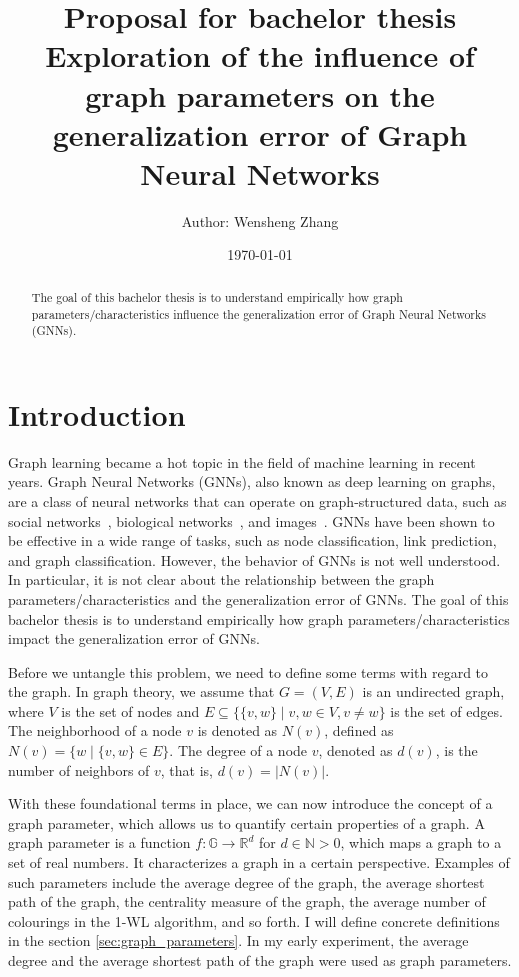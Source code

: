 \documentclass{article}
\title{\textbf{Proposal for bachelor thesis}\\
Exploration of the influence of graph parameters on the generalization error of Graph Neural Networks}
\author{Author: Wensheng Zhang}
\date{\today}
\begin{document}
 

\maketitle



\begin{abstract}
The goal of this bachelor thesis is to understand empirically how graph parameters/characteristics influence the generalization error of Graph Neural Networks (GNNs).
\end{abstract}


\section{Introduction}

Graph learning became a hot topic in the field of machine learning in recent years. Graph Neural Networks (GNNs), also known as deep learning on graphs, are a class of neural networks that can operate on graph-structured data, such as social networks~\cite{easley2010networks}, biological networks~\cite{barabasi2004network}, and images~\cite{simonovsky2017dynamic}. GNNs have been shown to be effective in a wide range of tasks, such as node classification, link prediction, and graph classification. However, the behavior of GNNs is not well understood. In particular, it is not clear about the relationship between the graph parameters/characteristics and the generalization error of GNNs. The goal of this bachelor thesis is to understand empirically how graph parameters/characteristics impact the generalization error of GNNs. 

Before we untangle this problem, we need to define some terms with regard to the graph. In graph theory, we assume that $G=(V,E)$ is an undirected graph, where $V$ is the set of nodes and $E  \subseteq \{\{v,w\}\mid v,w \in V , v \neq w\}$ is the set of edges. The neighborhood of a node $v$ is denoted as $N(v)$, defined as $N(v) = \{w \mid \{v,w\} \in E\}$. The degree of a node $v$, denoted as $d(v)$, is the number of neighbors of $v$, that is, $d(v) = |N(v)|$.

With these foundational terms in place, we can now introduce the concept of a graph parameter, which allows us to quantify certain properties of a graph. A graph parameter is a function $f: \mathbb{G} \rightarrow \mathbb{R}^d$ for $d\in \mathbb{N} >0$, which maps a graph to a set of real numbers. It characterizes a graph in a certain perspective. Examples of such parameters include the average degree of the graph, the average shortest path of the graph, the centrality measure of the graph, the average number of colourings in the 1-WL algorithm, and so forth. I will define concrete definitions in the section \ref{sec:graph_parameters}. In my early experiment, the average degree and the average shortest path of the graph were used as graph parameters.
\end{document}
